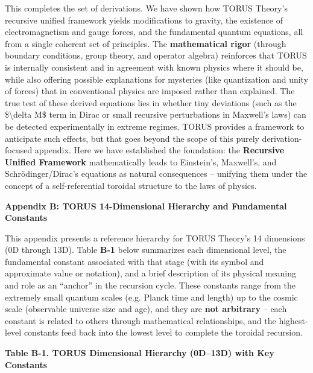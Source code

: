 \documentclass[
]{article}
\begin{document}
This completes the set of derivations. We have shown how TORUS Theory's
recursive unified framework yields modifications to gravity, the
existence of electromagnetism and gauge forces, and the fundamental
quantum equations, all from a single coherent set of principles. The
\textbf{mathematical rigor} (through boundary conditions, group theory,
and operator algebra) reinforces that TORUS is internally consistent and
in agreement with known physics where it should be, while also offering
possible explanations for mysteries (like quantization and unity of
forces) that in conventional physics are imposed rather than explained.
The true test of these derived equations lies in whether tiny deviations
(such as the \$\textbackslash delta M\$ term in Dirac or small recursive
perturbations in Maxwell's laws) can be detected experimentally in
extreme regimes. TORUS provides a framework to anticipate such
effects\hspace{0pt}, but that goes beyond the scope of this purely
derivation-focused appendix. Here we have established the foundation:
the \textbf{Recursive Unified Framework} mathematically leads to
Einstein's, Maxwell's, and Schrödinger/Dirac's equations as natural
consequences -- unifying them under the concept of a self-referential
toroidal structure to the laws of physics.

\textbf{Appendix B: TORUS 14-Dimensional Hierarchy and Fundamental
Constants}

This appendix presents a reference hierarchy for TORUS Theory's 14
dimensions (0D through 13D). Table \textbf{B-1} below summarizes each
dimensional level, the fundamental constant associated with that stage
(with its symbol and approximate value or notation), and a brief
description of its physical meaning and role as an ``anchor'' in the
recursion cycle. These constants range from the extremely small quantum
scales (e.g. Planck time and length) up to the cosmic scale (observable
universe size and age), and they are \textbf{not arbitrary} -- each
constant is related to others through mathematical relationships, and
the highest-level constants feed back into the lowest level to complete
the toroidal recursion\hspace{0pt}.

\textbf{Table B-1. TORUS Dimensional Hierarchy (0D--13D) with Key
Constants}\hspace{0pt}
\end{document}
